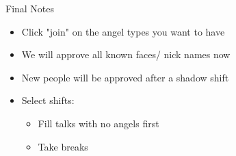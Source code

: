 
\begin{frame}{Final Notes}
	\begin{itemize}
		\item Click "join" on the angel types you want to have
		\item We will approve all known faces/ nick names now
		\item New people will be approved after a shadow shift
		\item Select shifts:
		\begin{itemize}
			\item Fill talks with no angels first
			\item Take breaks
		\end{itemize}
	\end{itemize}
\end{frame}
